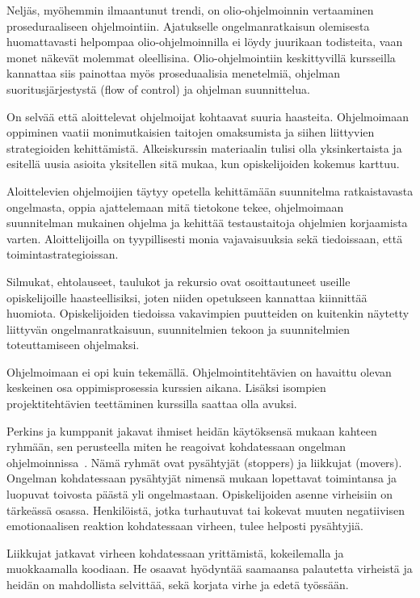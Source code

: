 \documentclass[finnish]{../tktltiki2}
\theoremstyle{definition}
\theoremstyle{remark}
\begin{document}
Neljäs, myöhemmin ilmaantunut trendi, on olio-ohjelmoinnin vertaaminen proseduraaliseen ohjelmointiin. Ajatukselle ongelmanratkaisun olemisesta huomattavasti helpompaa olio-ohjelmoinnilla ei löydy juurikaan todisteita, vaan monet näkevät molemmat oleellisina. Olio-ohjelmointiin keskittyvillä kursseilla kannattaa siis painottaa myös proseduaalisia menetelmiä, ohjelman suoritusjärjestystä (flow of control) ja ohjelman suunnittelua.

On selvää että aloittelevat ohjelmoijat kohtaavat suuria haasteita. Ohjelmoimaan oppiminen vaatii monimutkaisien taitojen omaksumista ja siihen liittyvien strategioiden kehittämistä. Alkeiskurssin materiaalin tulisi olla yksinkertaista ja esitellä uusia asioita yksitellen sitä mukaa, kun opiskelijoiden kokemus karttuu.

Aloittelevien ohjelmoijien täytyy opetella kehittämään suunnitelma ratkaistavasta ongelmasta, oppia ajattelemaan mitä tietokone tekee, ohjelmoimaan suunnitelman mukainen ohjelma ja kehittää testaustaitoja ohjelmien korjaamista varten. Aloittelijoilla on tyypillisesti monia vajavaisuuksia sekä tiedoissaan, että toimintastrategioissan.

Silmukat, ehtolauseet, taulukot ja rekursio ovat osoittautuneet useille opiskelijoille haasteellisiksi, joten niiden opetukseen kannattaa kiinnittää huomiota. Opiskelijoiden tiedoissa vakavimpien puutteiden on kuitenkin näytetty liittyvän ongelmanratkaisuun, suunnitelmien tekoon ja suunnitelmien toteuttamiseen ohjelmaksi.

Ohjelmoimaan ei opi kuin tekemällä. Ohjelmointitehtävien on havaittu olevan keskeinen osa oppimisprosessia kurssien aikana. Lisäksi isompien projektitehtävien teettäminen kurssilla saattaa olla avuksi.

Perkins ja kumppanit jakavat ihmiset heidän käytöksensä mukaan kahteen ryhmään, sen perusteella miten he reagoivat kohdatessaan ongelman ohjelmoinnissa~\cite{PHHMS86,RRR03}. Nämä ryhmät ovat pysähtyjät (stoppers) ja liikkujat (movers). Ongelman kohdatessaan pysähtyjät nimensä mukaan lopettavat toimintansa ja luopuvat toivosta päästä yli ongelmastaan. Opiskelijoiden asenne virheisiin on tärkeässä osassa. Henkilöistä, jotka turhautuvat tai kokevat muuten negatiivisen emotionaalisen reaktion kohdatessaan virheen, tulee helposti pysähtyjiä.

Liikkujat jatkavat virheen kohdatessaan yrittämistä, kokeilemalla ja muokkaamalla koodiaan. He osaavat hyödyntää saamaansa palautetta virheistä ja heidän on mahdollista selvittää, sekä korjata virhe ja edetä työssään.
\end{document}
